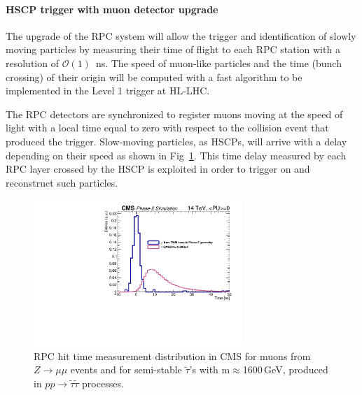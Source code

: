 \paragraph{HSCP trigger with muon detector upgrade}

The upgrade of the RPC system will allow the trigger and identification of slowly moving particles by measuring their time of flight to each RPC station with a resolution of $\mathcal{O}(1)$~ns. The speed of muon-like particles and the time (bunch crossing) of their origin will be computed with a fast algorithm to be implemented in the Level 1 trigger at HL-LHC. 

The RPC detectors are synchronized to register muons moving at the speed of light with a local time equal to zero with respect to the collision event that produced the trigger. Slow-moving particles, as HSCPs, will arrive with a delay depending on their speed as shown in Fig~\ref{fig:hscp_time}. This time delay measured by each RPC layer crossed by the HSCP is exploited in order to trigger on and reconstruct such particles. 

\begin{figure}[t]
\begin{center}
  \includegraphics[width=0.7\textwidth]{figures/HSCP/time.pdf}
  \caption{RPC hit time measurement distribution in CMS for muons from $Z \to \mu\mu$ events and 
  for semi-stable $\tilde \tau$'s with m$\approx$1600\,GeV, produced in $pp \to \tilde \tau \tilde \tau$ processes. }
  \label{fig:hscp_time}
\end{center}
\end{figure}

